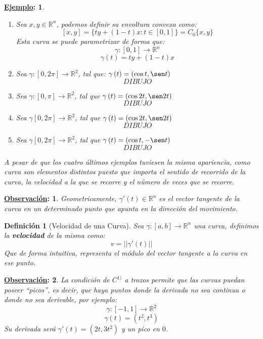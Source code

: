 \documentclass[10pt,a4paper,openright]{book}
\theoremstyle{break}
\newtheorem*{defi}{Definición}
\newtheorem*{obs}{\underline{Observación}:}
\newtheorem*{ej}{\underline{Ejemplo}:}
\begin{document}
\begin{ej}
\begin{enumerate}
    \item Sea $x, y \in \mathbb{R}^n$, podemos definir su envoltura convexa como: 
    $$\left[ x, y \right] = \{ty + \left( 1 - t \right) x: t \in \left[ 0, 1 \right]\} = C_0 \{x, y\}$$
    Esta curva se puede parametrizar de forma que:
    $$\gamma: \left[ 0, 1 \right] \rightarrow\mathbb{R}^n$$
    $$\gamma \left( t \right) = ty + \left( 1 - t \right) x$$

    \item Sea $\gamma: \left[ 0, 2\pi \right] \rightarrow \mathbb{R}^2$, tal que: $\gamma\left( t \right) = \left( \cos t, \sen t \right) $
    $$DIBUJO$$
    \item Sea $\gamma: \left[ 0, \pi \right] \rightarrow \mathbb{R}^2$, tal que $\gamma\left( t \right) = \left( \cos 2t, \sen 2t \right)$
    $$DIBUJO$$
    \item Sea $\gamma \left[ 0, 2\pi \right] \rightarrow \mathbb{R}^2$, tal que $\gamma \left( t \right) = \left( \cos 2t, \sen 2t \right)$
    $$DIBUJO$$
    \item Sea $\gamma \left[ 0, 2\pi \right] \rightarrow \mathbb{R}^2$, tal que $\gamma \left( t \right) = \left( \cos t, -\sen t \right) $
    $$DIBUJO$$ 
\end{enumerate}
A pesar de que los cuatro últimos ejemplos tuviesen la misma apariencia, como curva son elementos distintos puesto que importa el sentido de recorrido de la curva, la velocidad a la que se recorre y el número de veces que se recorre.
\end{ej}

\begin{obs}
Geometricamente, $\gamma'\left( t \right) \in \mathbb{R}^n$ es el vector tangente de la curva en un determinado punto que apunta en la dirección del movimiento.
\end{obs}

\begin{defi}[Velocidad de una Curva]
Sea $\gamma:[a,b]\rightarrow \mathbb{R}^n$ una curva, definimos la \textbf{velocidad} de la misma como: 
$$v = \lvert \lvert \gamma'\left( t \right) \rvert \rvert$$
Que de forma intuitiva, representa el módulo del vector tangente a la curva en ese punto.
\end{defi}

\begin{obs}
La condición de $C^{1)}$ a trozos permite que las curvas puedan poseer ``picos'', es decir, que haya puntos donde la derivada no sea continua o donde no sea derivable, por ejemplo: 
$$\gamma: \left[ -1, 1 \right] \rightarrow \mathbb{R}^2$$
$$\gamma \left( t \right) = \left( t^2, t^3 \right) $$
Su derivada será $\gamma'\left( t \right) = \left( 2t, 3t^2 \right)$ y un pico en $0$.
\end{obs}
\end{document}
